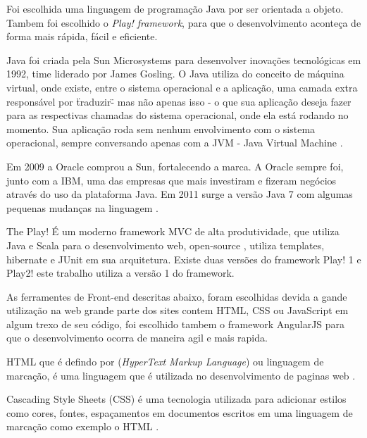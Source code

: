 
Foi escolhida uma linguagem de programação Java por ser orientada a objeto. Tambem foi escolhido o \textit{Play! framework}, para que o desenvolvimento aconteça de forma mais rápida, fácil e eficiente.\par

Java foi criada pela Sun Microsystems para desenvolver inovações tecnológicas em 1992, time liderado por James Gosling. O Java utiliza do conceito de máquina virtual, onde existe, entre o sistema operacional e a aplicação, uma camada extra responsável por \"traduzir\" - mas não apenas isso - o que sua aplicação deseja fazer para as respectivas chamadas do sistema operacional, onde ela está rodando no momento. Sua aplicação roda sem nenhum envolvimento com o sistema operacional, sempre conversando apenas com a JVM - Java Virtual Machine \cite{caelum}.\par

Em 2009 a Oracle comprou a Sun, fortalecendo a marca. A Oracle sempre foi, junto com a IBM, uma das empresas que mais investiram e fizeram negócios através do uso da plataforma Java. Em 2011 surge a versão Java 7 com algumas pequenas mudanças na linguagem \cite{caelum}.\par


The Play! É um moderno framework MVC de alta produtividade, que utiliza Java e Scala para o desenvolvimento web, open-source , utiliza templates, hibernate e JUnit  em sua arquitetura. Existe duas versões do framework Play! 1 e Play2! este trabalho utiliza a versão 1 do framework\cite{playframework}.\par



As ferramentes de Front-end descritas abaixo, foram escolhidas devida a gande utilização na web grande parte dos sites contem HTML, CSS ou JavaScript em algum trexo de seu código, foi escolhido tambem o framework AngularJS para que o desenvolvimento ocorra de maneira agil e mais rapida.\par

HTML que é defindo por (\textit{HyperText Markup Language}) ou linguagem de marcação, é uma linguagem que é utilizada no desenvolvimento de paginas web \cite{html}.\par

Cascading Style Sheets (CSS) é uma tecnologia utilizada para adicionar estilos como cores, fontes, espaçamentos em documentos escritos em uma linguagem de marcação como exemplo o HTML \cite{css}.\par

